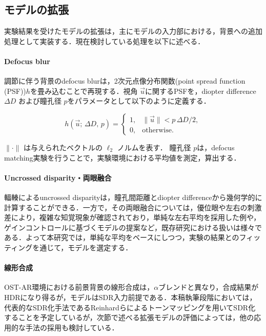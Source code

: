 \documentclass[a4j,10pt,fleqn]{rinkoj}
\begin{document}
\subsection{モデルの拡張}
実験結果を受けたモデルの拡張は，主にモデルの入力部における，背景への追加処理として実装する．現在検討している処理を以下に述べる．

\paragraph{Defocus blur}
調節に伴う背景のdefocus blurは，2次元点像分布関数(point spread function (PSF))$h$を畳み込むことで再現する．視角 $\vec{u}$に関するPSFを，diopter difference $\Delta D$ および瞳孔径 $p$をパラメータとして以下のように定義する．

\begin{equation}
h(\vec{u};\, \Delta D,\, p) =
\begin{cases}
1, & \|\vec{u}\| < p\,\Delta D / 2, \\
0, & \text{otherwise.}
\end{cases}
\label{eq:psf}
\end{equation}

$\|\cdot\|$ は与えられたベクトルの $\ell_2$ ノルムを表す．
瞳孔径 $p$は，defocus matching実験を行うことで，実験環境における平均値を測定，算出する．

\paragraph{Uncrossed disparity・両眼融合}
輻輳によるuncrossed disparityは，瞳孔間距離とdiopter differenceから幾何学的に計算することができる．一方で，その両眼融合については，優位眼や左右の刺激差により，複雑な知覚現象が確認されており，単純な左右平均を採用した例\cite{Chapiro2024ARDAVID}や，ゲインコントロールに基づくモデルの提案\cite{jian2006gain}など，既存研究における扱いは様々である．よって本研究では，単純な平均をベースにしつつ，実験の結果とのフィッティングを通じて，モデルを選定する．

\paragraph{線形合成}
OST-AR環境における前景背景の線形合成は，$\alpha$ブレンドと異なり，合成結果がHDRになり得るが，モデルはSDR入力前提である．本稿執筆段階においては，代表的なSDR化手法であるReinhardらによるトーンマッピング\cite{Reinhard2002tonemap}を用いてSDR化することを予定しているが，次節で述べる拡張モデルの評価によっては，他の応用的な手法の採用も検討している．
\end{document}
